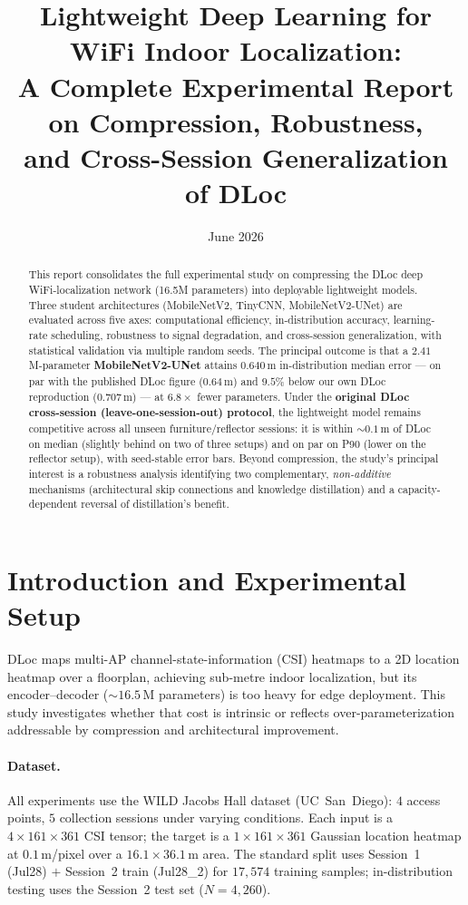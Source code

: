 \documentclass[11pt,a4paper]{article}
\title{\vspace{-1.5em}Lightweight Deep Learning for WiFi Indoor Localization:\\
A Complete Experimental Report on Compression, Robustness,\\
and Cross-Session Generalization of DLoc}
\author{}
\date{June 2026}
\begin{document}
\maketitle

\begin{abstract}
\noindent This report consolidates the full experimental study on compressing the DLoc deep
WiFi-localization network (16.5M parameters) into deployable lightweight models. Three student
architectures (MobileNetV2, TinyCNN, MobileNetV2-UNet) are evaluated across five axes:
computational efficiency, in-distribution accuracy, learning-rate scheduling, robustness to
signal degradation, and cross-session generalization, with statistical validation via multiple
random seeds. The principal outcome is that a $2.41$\,M-parameter \textbf{MobileNetV2-UNet}
attains $0.640$\,m in-distribution median error --- on par with the published DLoc figure
($0.64$\,m) and $9.5\%$ below our own DLoc reproduction ($0.707$\,m) --- at $6.8\times$ fewer
parameters. Under the \textbf{original DLoc cross-session (leave-one-session-out) protocol}, the
lightweight model remains competitive across all unseen furniture/reflector sessions: it is
within ${\sim}0.1$\,m of DLoc on median (slightly behind on two of three setups) and on par on
P90 (lower on the reflector setup), with seed-stable error bars. Beyond compression, the study's
principal interest is a robustness analysis identifying two complementary, \emph{non-additive}
mechanisms (architectural skip connections and knowledge distillation) and a capacity-dependent
reversal of distillation's benefit.
\end{abstract}

\tableofcontents
\newpage

\section{Introduction and Experimental Setup}
\label{sec:intro}

DLoc maps multi-AP channel-state-information (CSI) heatmaps to a 2D location heatmap over a
floorplan, achieving sub-metre indoor localization, but its encoder--decoder
(${\sim}16.5$\,M parameters) is too heavy for edge deployment. This study investigates whether
that cost is intrinsic or reflects over-parameterization addressable by compression and
architectural improvement.

\paragraph{Dataset.} All experiments use the WILD Jacobs Hall dataset (UC~San~Diego): $4$ access
points, $5$ collection sessions under varying conditions. Each input is a $4\times161\times361$
CSI tensor; the target is a $1\times161\times361$ Gaussian location heatmap at $0.1$\,m/pixel
over a $16.1\times36.1$\,m area. The standard split uses Session~1 (Jul28) $+$ Session~2 train
(Jul28\_2) for $17{,}574$ training samples; in-distribution testing uses the Session~2 test set
($N=4{,}260$).
\end{document}

